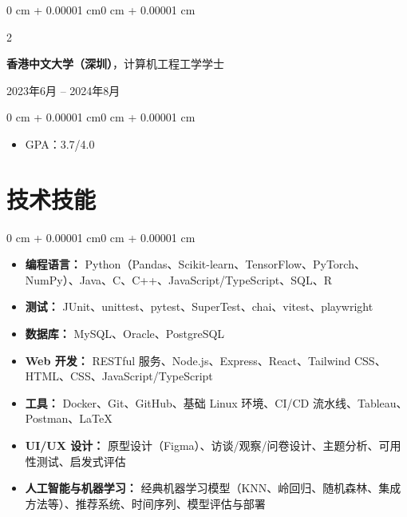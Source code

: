 \documentclass[10pt, letterpaper]{article}
\newenvironment{highlights}{
    \begin{itemize}[
        topsep=0.10 cm,
        parsep=0.10 cm,
        partopsep=0pt,
        itemsep=0pt,
        leftmargin=0 cm + 10pt
    ]
}{
    \end{itemize}
}
\newenvironment{onecolentry}{
    \begin{adjustwidth}{0 cm + 0.00001 cm}{0 cm + 0.00001 cm}
}{
    \end{adjustwidth}
}
\newenvironment{twocolentry}[2][]{
    \onecolentry
    \def\secondColumn{#2}
    \setcolumnwidth{\fill, 4.5 cm}
    \begin{paracol}{2}
}{
    \switchcolumn \raggedleft \secondColumn
    \end{paracol}
    \endonecolentry
}
\begin{document}
    \vspace{0.25 cm}

    \begin{twocolentry}{2023年6月 -- 2024年8月}
        \textbf{香港中文大学（深圳）}，计算机工程工学学士
    \end{twocolentry}

    \vspace{0.10 cm}
    \begin{onecolentry}
        \begin{highlights}
            \item GPA：3.7/4.0
        \end{highlights}
    \end{onecolentry}

    \vspace{0.2 cm}

    \section{技术技能}

    \vspace{0.10 cm}
    \begin{onecolentry}
        \begin{highlights}
            \item \textbf{编程语言：} Python（Pandas、Scikit-learn、TensorFlow、PyTorch、NumPy）、Java、C、C++、JavaScript/TypeScript、SQL、R
            \item \textbf{测试：} JUnit、unittest、pytest、SuperTest、chai、vitest、playwright
            \item \textbf{数据库：} MySQL、Oracle、PostgreSQL
            \item \textbf{Web 开发：} RESTful 服务、Node.js、Express、React、Tailwind CSS、HTML、CSS、JavaScript/TypeScript
            \item \textbf{工具：} Docker、Git、GitHub、基础 Linux 环境、CI/CD 流水线、Tableau、Postman、\LaTeX
            \item \textbf{UI/UX 设计：} 原型设计（Figma）、访谈/观察/问卷设计、主题分析、可用性测试、启发式评估
            \item \textbf{人工智能与机器学习：} 经典机器学习模型（KNN、岭回归、随机森林、集成方法等）、推荐系统、时间序列、模型评估与部署
        \end{highlights}
    \end{onecolentry}

    \vspace{0.05 cm}
\end{document}
